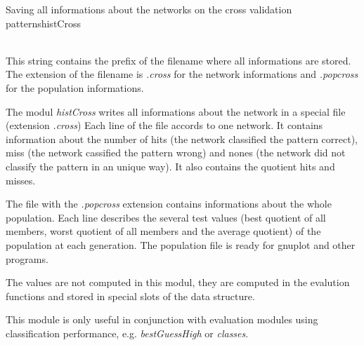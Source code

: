 \begin{moduledoc}{Saving all informations about the networks on the cross validation patterns}{histCross}

\item[\KeyWord{historyFile} \Param{filename}]~\\
This string contains the prefix of the filename where all informations are stored.
The extension of the filename is {\it .cross} for the network informations and
{\it .popcross} for the population informations.
\end{moduledoc}

The modul {\it histCross} writes all informations about the network in a special file 
(extension {\it .cross})
Each line of the file accords to one network. It contains information about the number 
of hits (the network classified the pattern correct), miss (the network cassified the pattern wrong)
and nones (the network did not classify the pattern in an unique way). 
It also contains the quotient  hits and misses.

The file with the {\it .popcross} extension contains informations about the whole 
population. Each line describes the several test values (best quotient of all members, 
worst quotient of all members and the average quotient) of the population 
at each generation.  The population file is ready for gnuplot and other
programs.

The values are not computed in this modul, they are computed in the evalution
functions and stored in special slots of the data structure.

This module is only useful in conjunction with  evaluation modules
using classification performance, e.g. {\it bestGuessHigh} or {\it classes}.


